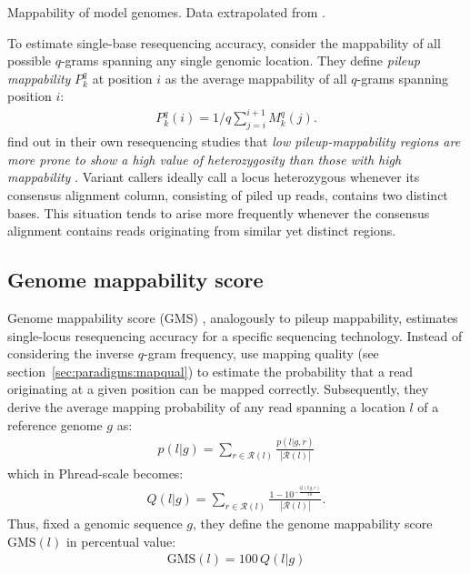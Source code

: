 \begin{table}[h]
\begin{center}
\caption[Mappability of model genomes]{Mappability of model genomes. Data extrapolated from \citep{Derrien2012}.}
\sffamily

\label{tab:mappability}
\end{center}
\end{table}

To estimate single-base resequencing accuracy, \citeauthor{Derrien2012} consider the mappability of all possible $q$-grams spanning any single genomic location.
They define \emph{pileup mappability} $P^q_k$ at position $i$ as the average mappability of all $q$-grams spanning position $i$:
\begin{eqnarray}
P^q_k(i) = 1/q \sum_{j=i}^{i+1}{M^q_k(j)}.
\end{eqnarray}
\citeauthor{Derrien2012} find out in their own resequencing studies that \emph{low pileup-mappability regions are more prone to show a high value of heterozygosity than those with high mappability} \citep{Derrien2012}.
Variant callers ideally call a locus heterozygous whenever its consensus alignment column, consisting of piled up reads, contains two distinct bases.
This situation tends to arise more frequently whenever the consensus alignment contains reads originating from similar yet distinct regions.

\subsection{Genome mappability score}

Genome mappability score (GMS) \citep{Lee2012}, analogously to pileup mappability, estimates single-locus resequencing accuracy for a specific sequencing technology.
Instead of considering the inverse $q$-gram frequency, \citeauthor{Lee2012} use mapping quality (see section~\ref{sec:paradigms:mapqual}) to estimate the probability that a read originating at a given position can be mapped correctly.
Subsequently, they derive the average mapping probability of any read spanning a location $l$ of a reference genome $g$ as:
\begin{eqnarray}
\label{eq:gms}
p(l|g) = \sum_{r \in \mathcal{R}(l)}{\frac{p(l|g,r)}{|\mathcal{R}(l)|}}
\end{eqnarray}
which in Phread-scale becomes:
\begin{eqnarray}
Q(l|g) = \sum_{r \in \mathcal{R}(l)}{\frac{1 - 10^{-\frac{Q(l|g,r)}{10}}}{|\mathcal{R}(l)|}}.
\end{eqnarray}
Thus, fixed a genomic sequence $g$, they define the genome mappability score $\text{GMS}(l)$ in percentual value:
\begin{eqnarray}
\text{GMS}(l) = 100 \, Q(l|g)
\end{eqnarray}

